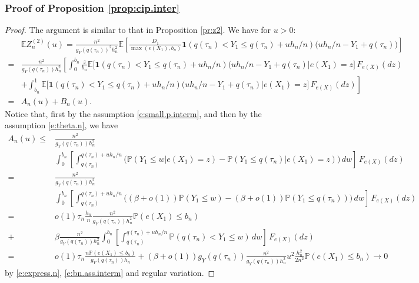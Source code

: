\documentclass[12pt]{amsart}
\newcommand{\LFe}{F_{e(X)}}
\newcommand{\1}{\mathbbm{1}}
\newcommand{\0}{\mathbf{0}}
\newcommand{\one}{\mathbf{1}}
\newcommand{\E}{\mathbb{E}}
\theoremstyle{plain}
\theoremstyle{definition}
\newcommand{\bbP}{\mathbb{P}}
\begin{document}
\subsubsection{Proof of Proposition \ref{prop:cip.inter}}
\begin{proof}
The argument is similar to that in Proposition \ref{pr:z2}. 
We have for $u>0$: 
\begin{align*}
&\E Z^{(2)}_{n}(u) = \frac{n^2}{g_Y(q(\tau_n))^2h_n^2}\E\left[   \frac{D_1}{\max(e(X_1),b_n)} \one
  (q(\tau_n)<Y_1\leq q(\tau_n)+uh_n/n) \bigl( uh_n/n-Y_1+q(\tau_n)\bigr)\right] \\
=&\frac{n^2}{g_Y(q(\tau_n))h_n^2}\left[       \int_0^{b_n} \frac{z}{b_n}  \E\bigl[  \one
  (q(\tau_n)<Y_1\leq q(\tau_n)+uh_n/n) \bigl( uh_n/n-Y_1+q(\tau_n)
   \big| e(X_1)=z\bigr]\, \LFe(dz)  \right. \\
  &\left.  + \int_{b_n}^1    \E\bigl[  \one
  (q(\tau_n)<Y_1\leq q(\tau_n)+uh_n/n) \bigl( uh_n/n-Y_1+q(\tau_n)
   \big| e(X_1)=z\bigr]\, \LFe(dz) 
\right] \\
=& A_n(u) +B_n(u). 
\end{align*}
Notice that, first  by the assumption \eqref{e:small.p.interm}, and
then by the assumption \eqref{e:theta.n}, we have  
%
\begin{align*}
A_n(u) \leq& \frac{n^2}{g_Y(q(\tau_n))h_n^2}  \\
&\int_0^{b_n} \left[
  \int_{q(\tau_n)}^{q(\tau_n)+uh_n/n} \bigl( \bbP(Y_1\leq
  w|e(X_1)=z)-\bbP(Y_1\leq q(\tau_n)|e(X_1)=z)\bigr)\, dw\right]\, \LFe(dz) \\
=& \frac{n^2}{g_Y(q(\tau_n))h_n^2}  \\
&\int_0^{b_n} \left[
  \int_{q(\tau_n)}^{q(\tau_n)+uh_n/n} \bigl( (\beta +o(1))\bbP(Y_1\leq
  w)-(\beta+o(1))\bbP(Y_1\leq q(\tau_n))\bigr)\, dw\right]\, \LFe(dz) \\
=&o(1)\tau_n \frac{h_n}{n}\frac{n^2}{g_Y(q(\tau_n))h_n^2}\bbP(e(X_1)\leq b_n)\\
+& \beta \frac{n^2}{g_Y(q(\tau_n))h_n^2} 
\int_0^{b_n} \left[
  \int_{q(\tau_n)}^{q(\tau_n)+uh_n/n}  \bbP(q(\tau_n)<Y_1\leq
  w) \, dw\right]\, \LFe(dz)\\
=& o(1)\tau_n  \frac{n\bbP(e(X_1)\leq b_n)}{g_Y(q(\tau_n))h_n}
+ (\beta+o(1)) g_Y(q(\tau_n))\frac{n^2}{g_Y(q(\tau_n))h_n^2} 
  u^2\frac{h_n^2}{2n^2} \bbP(e(X_1)\leq b_n) \to 0
\end{align*}
by \eqref{e:express.n}, \eqref{e:bn.ass.interm} and regular
variation. 


\end{proof}
\end{document}
